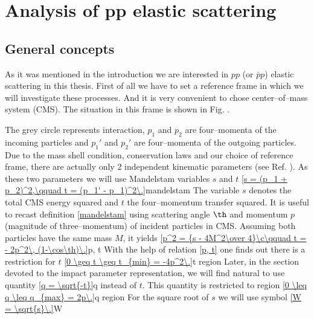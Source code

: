 \def\qt{q_{\perp}}
\def\fg{Fig\hbox{.}}
\def\fgs{Figs\hbox{.}}
\def\Fg{Fig\hbox{.}}
\def\Fgs{Figs\hbox{.}}
\def\equ{Eq\hbox{.}}
\def\equs{Eqs\hbox{.}}
\def\Equ{Eq\hbox{.}}
\def\Equs{Eqs\hbox{.}}
\def\rf{Ref.\spacefactor=1000}
\def\rfs{Refs.\spacefactor=1000}
\def\percent{\%%
}



\chapter{Analysis of pp elastic scattering}

\section{General concepts}
As it was mentioned in the introduction we are interested in $pp$ (or $\bar pp$) elastic scattering in this thesis. First of all we have to set a reference frame in which we will investigate these processes. And it is very convenient to chose center--of--mass system (CMS). The situation in this frame is shown in \fg{} . 


The grey circle represents interaction, $p_1$ and $p_2$ are four--momenta of the incoming particles and $p_1'$ and $p_2'$ are four--momenta of the outgoing particles. Due to the mass shell condition, conservation laws and our choice of reference frame, there are actually only 2 independent kinematic parameters (see \rf{} ). As these two parameters
we will use Mandelstam variables $s$ and $t$
\eqref{s = (p_1 + p_2)^2,\qquad t = (p_1' - p_1)^2\.}{mandelstam}
The variable $s$ denotes the total CMS energy squared and $t$ the four--momentum transfer squared. It is useful to recast definition \ref{mandelstam} using scattering angle $\th$ and momentum $p$ (magnitude of three--momentum) of incident particles in CMS. Assuming both particles have the same mass $M$, it yields
\eqref{p^2 = {s - 4M^2\over 4}\c\qquad t = - 2p^2\, (1-\cos\th)\.}{p, t}
With the help of relation \ref{p, t} one finds out there is a restriction for $t$
\eqref{0 \geq t \geq t_{min} = -4p^2\.}{t region}
Later, in the section devoted to the impact parameter representation, we will find natural to use quantity
\eqref{q = \sqrt{-t}}{q}
instead of $t$. This quantity is restricted to region
\eqref{0 \leq q \leq q_{max} = 2p\.}{q region}
For the square root of $s$ we will use symbol
\eqref{W = \sqrt{s}\.}{W}

